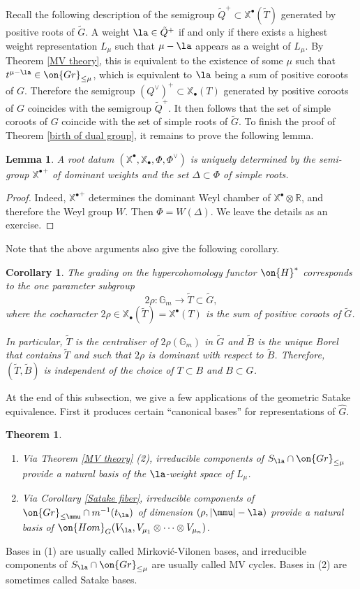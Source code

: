 \documentclass[]{pcmi}
\theoremstyle{plain}
\newtheorem{thm}[equation]{Theorem}
\newtheorem{lem}[equation]{Lemma}
\newtheorem{cor}[equation]{Corollary}
\theoremstyle{remark}
\theoremstyle{definition}
\newcommand{\bG}{{\mathbb G}}
\newcommand{\bR}{{\mathbb R}}
\newcommand{\Gr}{{\on{Gr}}}
\newcommand{\Hom}{{\on{Hom}}}
\def\xcoch{\mathbb{X}_\bullet}
\def\xch{\mathbb{X}^\bullet}
\begin{document}
Recall the following description of the semigroup $\tilde Q^+\subset \xch(\tilde T)$ generated by positive roots of $\tilde G$. A weight $\la\in \tilde Q^+$ if and only if there exists a highest weight representation $L_\mu$ such that $\mu-\la$ appears as a weight of $L_\mu$. By Theorem \ref{MV theory}, this is equivalent to the existence of some $\mu$ such that $t^{\mu-\la}\in \Gr_{\leq \mu}$, which is equivalent to $\la$ being a sum of positive coroots of $G$.
Therefore the semigroup  $(Q^\vee)^+\subset\xcoch(T)$ generated by positive coroots of $G$ coincides with the semigroup $\tilde Q^+$. It then follows that the set of simple coroots of $G$ coincide with the set of simple roots of $\tilde G$. 
To finish the proof of Theorem \ref{birth of dual group}, it remains to prove the following lemma.
\begin{lem}
A root datum $(\xch,\xcoch,\Phi,\Phi^\vee)$ is uniquely determined by the semi-group ${\xch}^+$ of dominant weights and the set $\Delta\subset\Phi$ of simple roots.
\end{lem}
\begin{proof}Indeed, ${\xch}^+$ determines the dominant Weyl chamber of $\xch\otimes \bR$, and therefore the Weyl group $W$. Then $\Phi=W(\Delta)$. We leave the details as an exercise.
\end{proof}
Note that the above arguments also give the following corollary.

\begin{cor}\label{canonical TB}
The grading on the hypercohomology functor $\on{H}^*$ corresponds to the one parameter subgroup 
$$2\rho:\bG_m\to \tilde T\subset \tilde G,$$ 
where the cocharacter $2\rho\in \xcoch(\tilde T)=\xch(T)$ is the sum of positive coroots of $\tilde G$. 

In particular, $\tilde T$ is the centraliser of $2\rho(\bG_m)$ in $\tilde G$ and $\tilde B$ is the unique Borel that contains $\tilde T$ and such that $2\rho$ is dominant with respect to $\tilde B$. Therefore, $(\tilde T,\tilde B)$ is independent of the choice of $T\subset B$ and $B\subset G$.
\end{cor}


At the end of this subsection, we give a few applications of the geometric Satake equivalence. First it produces certain ``canonical bases'' for representations of $\hat G$.


\begin{thm}\label{MV basis}~
\begin{enumerate}
\item Via Theorem \ref{MV theory} (2), irreducible components of $S_\la\cap \Gr_{\leq \mu}$ provide a natural basis of the $\la$-weight space of $L_\mu$.

\item Via Corollary \eqref{Satake fiber}, irreducible components of $\Gr_{\leq \mmu}\cap m^{-1}(t_\la)$ of dimension $(\rho,|\mmu|-\la)$ provide a natural basis of $\Hom_G(V_\la, V_{\mu_1}\otimes\cdots\otimes V_{\mu_n})$.
\end{enumerate}
\end{thm}
Bases in (1) are usually called Mirkovi\'c-Vilonen bases, and irreducible components of $S_\la \cap \Gr_{\leq \mu}$ are usually called MV cycles. Bases in (2) are sometimes called Satake bases.
\end{document}
